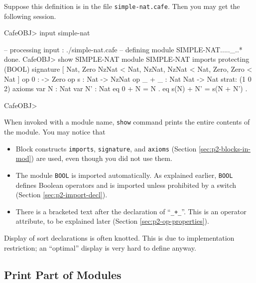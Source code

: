 \documentclass[a4paper]{memoir}
\begin{document}
Suppose this definition is in the file \verb|simple-nat.cafe|. Then
you may get the following session.
\begin{vvtm}
\begin{ccode}
  CafeOBJ> input simple-nat

  -- processing input : ./simple-nat.cafe
  -- defining module SIMPLE-NAT....._..* done.
  CafeOBJ> show SIMPLE-NAT  
  module SIMPLE-NAT {
    imports {
      protecting (BOOL)
    }
    signature {
      [ Nat, Zero NzNat < Nat,
        NzNat, NzNat < Nat,
        Zero, Zero < Nat ]
      op 0 : -> Zero
      op s : Nat -> NzNat
      op _ + _ : Nat Nat -> Nat { strat: (1 0 2) }
    }
    axioms {
      var N : Nat
      var N' : Nat
      eq 0 + N = N .
      eq s(N) + N' = s(N + N') .
    }
  }

  CafeOBJ>
\end{ccode}
\end{vvtm}
When invoked with a module name, \verb|show| command prints the entire
contents of the module. You may notice that
\begin{itemize}
\item Block constructs \verb|imports|, \verb|signature|, and
  \verb|axioms| (Section \ref{sec:p2-blocks-in-mod}) are used,
  even though you did not use them.
\item The module \verb|BOOL| is imported automatically. As explained
  earlier, \verb|BOOL| defines Boolean operators and is imported unless
  prohibited by a switch (Section \ref{sec:p2-import-decl}).
\item There is a bracketed text after the declaration of ``\verb|_+_|''.
  This is an operator attribute, to be explained later
 (Section \ref{sec:p2-op-properties}).
\end{itemize}
\begin{warning}
  Display of sort declarations is often knotted. This is due to
  implementation restriction; an ``optimal'' display is very hard to
  define anyway.
\end{warning}

\subsection{Print Part of Modules}\label{sec:p2-print-part-of-module}
\end{document}
